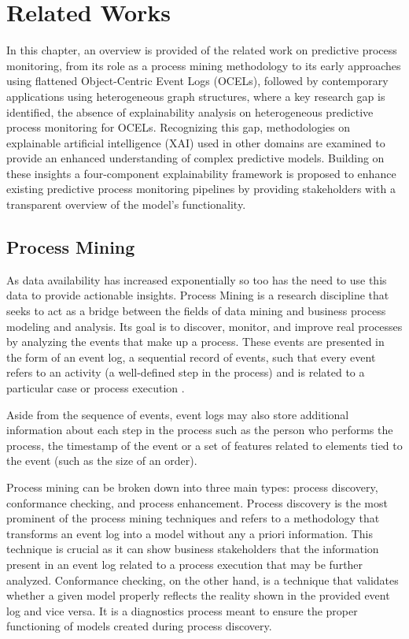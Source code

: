 
\chapter{Related Works}
\label{chp:relatedWorks}

In this chapter, an overview is provided of the related work on predictive process monitoring, from its role as a process mining methodology to its early approaches using flattened Object-Centric Event Logs (OCELs), followed by contemporary applications using heterogeneous graph structures, where a key research gap is identified, the absence of explainability analysis on heterogeneous predictive process monitoring for OCELs. Recognizing this gap, methodologies on explainable artificial intelligence (XAI) used in other domains are examined to provide an enhanced understanding of complex predictive models. Building on these insights a four-component explainability framework is proposed to enhance existing predictive process monitoring pipelines by providing stakeholders with a transparent overview of the model's functionality.

\section{Process Mining}
    As data availability has increased exponentially so too has the need to use this data to provide actionable insights. Process Mining is a research discipline that seeks to act as a bridge between the fields of data mining and business process modeling and analysis. Its goal is to discover, monitor, and improve real processes by analyzing the events that make up a process. These events are presented in the form of an event log, a sequential record of events, such that every event refers to an activity (a well-defined step in the process) and is related to a particular case or process execution \cite{vanderaalst2012}. 
    
    Aside from the sequence of events, event logs may also store additional information about each step in the process such as the person who performs the process, the timestamp of the event or a set of features related to elements tied to the event (such as the size of an order).
    
    Process mining can be broken down into three main types: process discovery, conformance checking, and process enhancement.
    Process discovery is the most prominent of the process mining techniques and refers to a methodology that transforms an event log into a model without any a priori information. This technique is crucial as it can show business stakeholders that the information present in an event log related to a process execution that may be further analyzed.
    Conformance checking, on the other hand, is a technique that validates whether a given model properly reflects the reality shown in the provided event log and vice versa. It is a diagnostics process meant to ensure the proper functioning of models created during process discovery.

